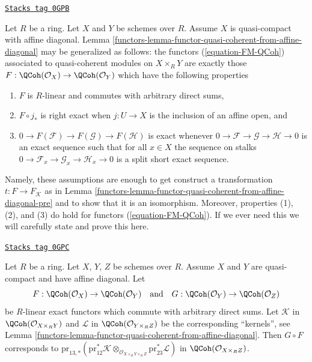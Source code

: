 \begin{remark}
\label{functors-remark-characterize-FM-QCoh}
\href{https://stacks.math.columbia.edu/tag/0GPB}{\texttt{Stacks tag 0GPB}}

Let $R$ be a ring. Let $X$ and $Y$ be schemes over $R$. Assume $X$
is quasi-compact with affine diagonal.
Lemma \ref{functors-lemma-functor-quasi-coherent-from-affine-diagonal} may
be generalized as follows: the functors
(\ref{equation-FM-QCoh}) associated to quasi-coherent modules on
$X \times_R Y$ are exactly those
$F : \QCoh(\mathcal{O}_X) \to \QCoh(\mathcal{O}_Y)$
which have the following properties
\begin{enumerate}
\item $F$ is $R$-linear and commutes with arbitrary direct sums,
\item $F \circ j_*$ is right exact when $j : U \to X$ is the
inclusion of an affine open, and
\item $0 \to F(\mathcal{F}) \to F(\mathcal{G}) \to F(\mathcal{H})$
is exact whenever $0 \to \mathcal{F} \to \mathcal{G} \to \mathcal{H} \to 0$
is an exact sequence such that for all $x \in X$ the sequence on stalks
$0 \to \mathcal{F}_x \to \mathcal{G}_x \to \mathcal{H}_x \to 0$
is a split short exact sequence.
\end{enumerate}
Namely, these assumptions are enough to get construct a transformation
$t : F \to F_\mathcal{K}$ as in
Lemma \ref{functors-lemma-functor-quasi-coherent-from-affine-diagonal-pre}
and to show that it is an isomorphism. Moreover, properties (1), (2), and (3)
do hold for functors (\ref{equation-FM-QCoh}).
If we ever need this we will carefully state and prove this here.
\end{remark}

\begin{lemma}
\label{functors-lemma-compose-FM-QCoh}
\href{https://stacks.math.columbia.edu/tag/0GPC}{\texttt{Stacks tag 0GPC}}

Let $R$ be a ring. Let $X$, $Y$, $Z$ be schemes over $R$. Assume
$X$ and $Y$ are quasi-compact and have affine diagonal. Let
$$
F : \QCoh(\mathcal{O}_X) \to \QCoh(\mathcal{O}_Y)
\quad\text{and}\quad
G : \QCoh(\mathcal{O}_Y) \to \QCoh(\mathcal{O}_Z)
$$
be $R$-linear exact functors which commute with arbitrary direct sums.
Let $\mathcal{K}$ in $\QCoh(\mathcal{O}_{X \times_R Y})$
and $\mathcal{L}$ in $\QCoh(\mathcal{O}_{Y \times_R Z})$
be the corresponding ``kernels'', see
Lemma \ref{functors-lemma-functor-quasi-coherent-from-affine-diagonal}.
Then $G \circ F$ corresponds to
$\text{pr}_{13, *}(\text{pr}_{12}^*\mathcal{K}
\otimes_{\mathcal{O}_{X \times_R Y \times_R Z}}
\text{pr}_{23}^*\mathcal{L})$ in $\QCoh(\mathcal{O}_{X \times_R Z})$.
\end{lemma}

